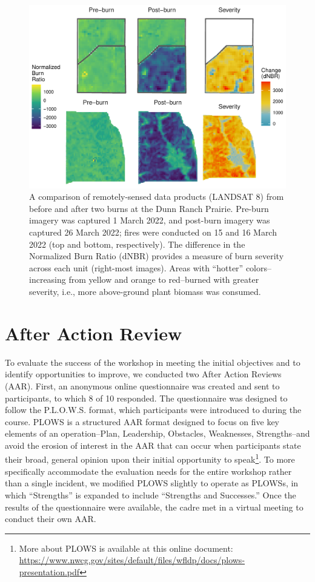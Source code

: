 \documentclass[fire,article,submit,moreauthors,pdftex]{Definitions/mdpi}
\begin{document}
\begin{figure}
\centering
\includegraphics[width=1\columnwidth]{severity_gg-1.pdf}
\caption{A comparison of remotely-sensed data products (LANDSAT 8) from before and after two burns at the Dunn Ranch Prairie. Pre-burn imagery was captured 1 March 2022, and post-burn imagery was captured 26 March 2022; fires were conducted on 15 and 16 March 2022 (top and bottom, respectively). The difference in the Normalized Burn Ratio (dNBR) provides a measure of burn severity across each unit (right-most images). Areas with ``hotter'' colors--increasing from yellow and orange to red--burned with greater severity, i.e., more above-ground plant biomass was consumed. \label{severity}}
\end{figure}

\section{After Action Review}

To evaluate the success of the workshop in meeting the initial objectives and to identify opportunities to improve, we conducted two After Action Reviews (AAR).
First, an anonymous online questionnaire was created and sent to participants, to which 8 of 10 responded.
The questionnaire was designed to follow the P.L.O.W.S. format, which participants were introduced to during the course.
PLOWS is a structured AAR format designed to focus on five key elements of an operation--Plan, Leadership, Obstacles, Weaknesses, Strengths--and avoid the erosion of interest in the AAR that can occur when participants state their broad, general opinion upon their initial opportunity to speak\footnote{More about PLOWS is available at this online document: \url{https://www.nwcg.gov/sites/default/files/wfldp/docs/plows-presentation.pdf}}.
To more specifically accommodate the evaluation needs for the entire workshop rather than a single incident, we modified PLOWS slightly to operate as PLOWSs, in which ``Strengths'' is expanded to include ``Strengths and Successes.''
Once the results of the questionnaire were available, the cadre met in a virtual meeting to conduct their own AAR.
\end{document}
